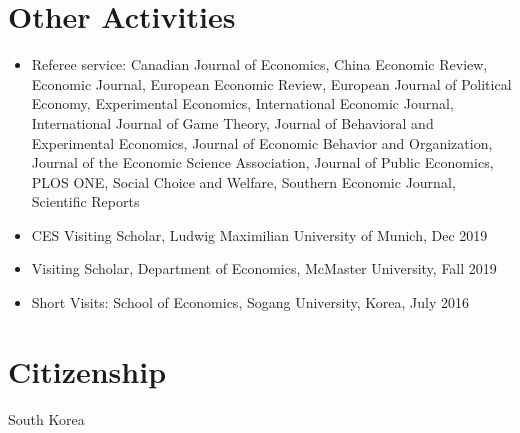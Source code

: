 \documentclass[margin, a4paper]{res}
\begin{document}
\begin{resume}

\section{Other Activities}
\begin{itemize}[leftmargin=*]
\item Referee service: Canadian Journal of Economics, China Economic Review, Economic Journal, European Economic Review, European Journal of Political Economy, Experimental Economics, International Economic Journal, International Journal of Game Theory, Journal of Behavioral and Experimental Economics, Journal of Economic Behavior and Organization, Journal of the Economic Science Association, Journal of Public Economics, PLOS ONE, Social Choice and Welfare, Southern Economic Journal, Scientific Reports
\item CES Visiting Scholar, Ludwig Maximilian University of Munich, Dec 2019
\item Visiting Scholar, Department of Economics, McMaster University, Fall 2019
\item Short Visits: School of Economics, Sogang University, Korea, July 2016
\end{itemize}

\section{Citizenship} South Korea %


\end{resume}
\end{document}
